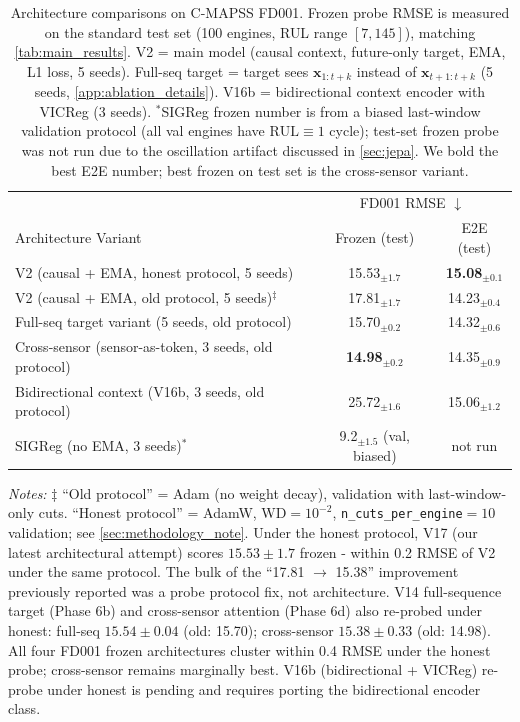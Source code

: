 \documentclass{article}
\newcommand{\x}{\mathbf{x}}
\newcommand{\rul}{\text{RUL}}
\begin{document}
\begin{table}[t]
\centering
\caption{Architecture comparisons on C-MAPSS FD001. Frozen probe RMSE is measured on the standard test set (100 engines, RUL range $[7, 145]$), matching \cref{tab:main_results}. V2 = main model (causal context, future-only target, EMA, L1 loss, 5 seeds). Full-seq target = target sees $\x_{1:t+k}$ instead of $\x_{t+1:t+k}$ (5 seeds, \cref{app:ablation_details}). V16b = bidirectional context encoder with VICReg (3 seeds). $^*$SIGReg frozen number is from a biased last-window validation protocol (all val engines have $\rul \equiv 1$ cycle); test-set frozen probe was not run due to the oscillation artifact discussed in \cref{sec:jepa}. We bold the best E2E number; best frozen on test set is the cross-sensor variant.}
\label{tab:ablation}
\small
\begin{tabular}{@{}l|cc@{}}
\toprule
& \multicolumn{2}{c}{FD001 RMSE $\downarrow$} \\
Architecture Variant & Frozen (test) & E2E (test) \\
\midrule
V2 (causal + EMA, honest protocol, 5 seeds) & 15.53$_{\pm1.7}$ & \textbf{15.08}$_{\pm0.1}$ \\
V2 (causal + EMA, old protocol, 5 seeds)$^\ddagger$ & 17.81$_{\pm1.7}$ & 14.23$_{\pm0.4}$ \\
Full-seq target variant (5 seeds, old protocol) & 15.70$_{\pm0.2}$ & 14.32$_{\pm0.6}$ \\
Cross-sensor (sensor-as-token, 3 seeds, old protocol) & \textbf{14.98}$_{\pm0.2}$ & 14.35$_{\pm0.9}$ \\
Bidirectional context (V16b, 3 seeds, old protocol) & 25.72$_{\pm1.6}$ & 15.06$_{\pm1.2}$ \\
SIGReg (no EMA, 3 seeds)$^*$ & 9.2$_{\pm1.5}$ (val, biased) & not run \\
\bottomrule
\end{tabular}

\vspace{2pt}
{\footnotesize\raggedright\textit{Notes:} $\ddagger$ ``Old protocol'' = Adam (no weight decay), validation with last-window-only cuts. ``Honest protocol'' = AdamW, WD$=10^{-2}$, \texttt{n\_cuts\_per\_engine}$=10$ validation; see \cref{sec:methodology_note}. Under the honest protocol, V17 (our latest architectural attempt) scores $15.53 \pm 1.7$ frozen - within 0.2 RMSE of V2 under the same protocol. The bulk of the ``17.81 $\to$ 15.38'' improvement previously reported was a probe protocol fix, not architecture. V14 full-sequence target (Phase 6b) and cross-sensor attention (Phase 6d) also re-probed under honest: full-seq $15.54 \pm 0.04$ (old: 15.70); cross-sensor $15.38 \pm 0.33$ (old: 14.98). All four FD001 frozen architectures cluster within 0.4 RMSE under the honest probe; cross-sensor remains marginally best. V16b (bidirectional + VICReg) re-probe under honest is pending and requires porting the bidirectional encoder class. \par}
\end{table}
\end{document}

